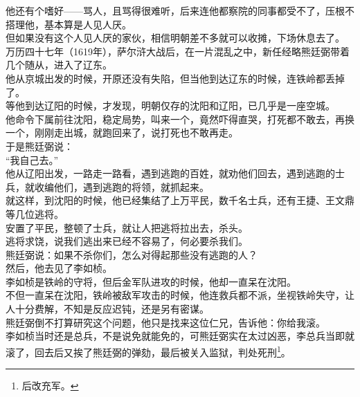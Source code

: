\begin{multicols}{\theparacolNo}
他还有个嗜好——骂人，且骂得很难听，后来连他都察院的同事都受不了，压根不搭理他，基本算是人见人厌。\\

但如果没有这个人见人厌的家伙，相信明朝差不多就可以收摊，下场休息去了。\\

万历四十七年（1619年），萨尔浒大战后，在一片混乱之中，新任经略熊廷弼带着几个随从，进入了辽东。\\

他从京城出发的时候，开原还没有失陷，但当他到达辽东的时候，连铁岭都丢掉了。\\

等他到达辽阳的时候，才发现，明朝仅存的沈阳和辽阳，已几乎是一座空城。\\

他命令下属前往沈阳，稳定局势，叫来一个，竟然吓得直哭，打死都不敢去，再换一个，刚刚走出城，就跑回来了，说打死也不敢再走。\\

于是熊廷弼说：\\

“我自己去。”\\

他从辽阳出发，一路走一路看，遇到逃跑的百姓，就劝他们回去，遇到逃跑的士兵，就收编他们，遇到逃跑的将领，就抓起来。\\

就这样，到沈阳的时候，他已经集结了上万平民，数千名士兵，还有王捷、王文鼎等几位逃将。\\

安置了平民，整顿了士兵，就让人把逃将拉出去，杀头。\\

逃将求饶，说我们逃出来已经不容易了，何必要杀我们。\\

熊廷弼说：如果不杀你们，怎么对得起那些没有逃跑的人？\\

然后，他去见了李如桢。\\

李如桢是铁岭的守将，但后金军队进攻的时候，他却一直呆在沈阳。\\

不但一直呆在沈阳，铁岭被敌军攻击的时候，他连救兵都不派，坐视铁岭失守，让人十分费解，不知是反应迟钝，还是另有密谋。\\

熊廷弼倒不打算研究这个问题，他只是找来这位仁兄，告诉他：你给我滚。\\

李如桢当时还是总兵，不是说免就能免的，可熊廷弼实在太过凶恶，李总兵当即就滚了，回去后又挨了熊廷弼的弹劾，最后被关入监狱，判处死刑\footnote{后改充军。}。\\


\end{multicols}
